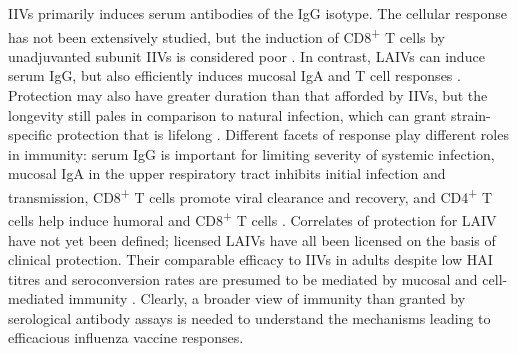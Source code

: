 \Glspl{IIV} primarily induces serum antibodies of the IgG isotype.
The cellular response has not been extensively studied,
but the induction of CD8\textsuperscript{+} T cells by unadjuvanted subunit \glspl{IIV} is considered poor \autocite{bresee2018InactivatedInfluenzaVaccines,koutsakos2018CirculatingFHCells}.
In contrast, \glspl{LAIV} can induce serum IgG, but also efficiently induces mucosal IgA and T cell responses \autocite{luke2018InfluenzaVaccineLive}.
Protection may also have greater duration than that afforded by \glspl{IIV}, 
but the longevity still pales in comparison to natural infection, which can grant strain-specific protection that is lifelong \autocite{houser2015InfluenzaVaccinesChallenges,bresee2018InactivatedInfluenzaVaccines,luke2018InfluenzaVaccineLive,krammer2019HumanAntibodyResponse}.
Different facets of response play different roles in immunity:
serum IgG is important for limiting severity of systemic infection, 
mucosal IgA in the upper respiratory tract inhibits initial infection and transmission, 
CD8\textsuperscript{+} T cells promote viral clearance and recovery,
and CD4\textsuperscript{+} T cells help induce humoral and CD8\textsuperscript{+} T cells
\autocite{renegar2004RoleIgAIgG,sano2017RoadMoreEffective,krammer2018Influenza,bresee2018InactivatedInfluenzaVaccines}.
Correlates of protection for \gls{LAIV} have not yet been defined;
licensed \glspl{LAIV} have all been licensed on the basis of clinical protection.
Their comparable efficacy to \glspl{IIV} in adults despite low \gls{HAI} titres and seroconversion rates are presumed to be mediated by mucosal and cell-mediated immunity \autocite{luke2018InfluenzaVaccineLive,krammer2019HumanAntibodyResponse}.
%
Clearly, a broader view of immunity than granted by serological antibody assays is needed to understand the mechanisms leading to efficacious influenza vaccine responses.

